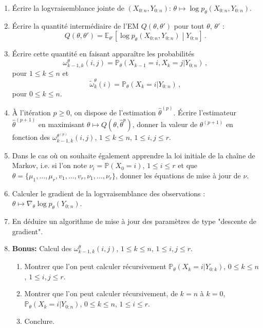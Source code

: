 \documentclass[a4paper,10pt,fleqn]{article}
\newcommand{\1}{\ensuremath{\mathbbm{1}}}
\begin{document}
\begin{enumerate}
\item \'Ecrire la logvraisemblance jointe de $(X_{0:n},Y_{0:n})$: $\theta \mapsto \log p_\theta (X_{0:n},Y_{0:n})$.
\item \'Ecrire la quantit\'e interm\'ediaire de l'EM $Q(\theta,\theta')$ pour tout $\theta$, $\theta'$ :
$$
Q(\theta,\theta') = \mathbb{E}_{\theta'}\left[\log p_\theta (X_{0:n},Y_{0:n})\middle |Y_{0:n}\right]\,.
$$
\item \'Ecrire cette quantit\'e en faisant appara\^itre les probabilit\'es
$$
\omega_{k-1,k}^{\theta}(i,j) = \mathbb{P}_{\theta}\left(X_{k-1}=i,X_k=j|Y_{0:n}\right)\,,
$$
pour $1\leq k \leq n$ et
$$
\tilde \omega_{k}^{\theta}(i) = \mathbb{P}_{\theta}\left(X_k=i|Y_{0:n}\right)\,,
$$
pour $0\leq k \leq n$.
\item \`A l'it\'eration $p\geq 0$, on dispose de l'estimation $\hat\theta^{(p)}$. \'Ecrire l'estimateur $\hat\theta^{(p+1)}$ en maximisant $\theta\mapsto Q(\theta,\hat\theta^{p})$, donner la valeur de $\theta^{(p+1)}$ en fonction des $\omega_{k-1,k}^{\theta^{(p)}}(i,j)$, $1\leq k \leq n$, $1\leq i, j \leq r$.
\item Dans le cas o\`u on souhaite \'egalement apprendre la loi initiale de la cha\^ine de Markov, i.e. si l'on note $\nu_i = \mathbb{P}(X_0=i)$, $1\leq i \leq r$ et que $\theta = \{\mu_1,\ldots,\mu_r,v_1,\ldots,v_r,\nu_1,\ldots,\nu_r\}$, donner les \'equations de mise \`a jour de $\nu$. 
\item Calculer le gradient de la logvraisemblance des observations : $\theta\mapsto\nabla_\theta \log p_\theta(Y_{0:n})$.
\item En d\'eduire un algorithme de mise \`a jour des param\`etres de type "descente de gradient".
\item {\bf Bonus:} Calcul des $\omega_{k-1,k}^{\theta}(i,j)$, $1\leq k \leq n$, $1\leq i, j \leq r$.
\begin{enumerate}
\item Montrer que l'on peut calculer r\'ecursivement $ \mathbb{P}_{\theta}\left(X_k=i|Y_{0:k}\right)$, $0\leq k \leq n$, $1\leq i, j \leq r$.
\item Montrer que l'on peut calculer r\'ecursivement, de $k=n$ \`a $k = 0$, $ \mathbb{P}_{\theta}\left(X_k=i|Y_{0:n}\right)$, $0\leq k \leq n$, $1\leq i\leq r$.
\item Conclure.
\end{enumerate}
\end{enumerate}
\end{document}
